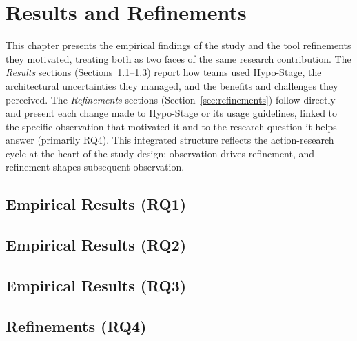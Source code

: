 
\chapter{Results and Refinements}
\label{chap:results}
\label{ch:results}

This chapter presents the empirical findings of the study and the tool refinements
they motivated, treating both as two faces of the same research contribution. The
\emph{Results} sections (Sections~\ref{sec:results-rq1}--\ref{sec:results-rq3}) report
how teams used Hypo-Stage, the architectural uncertainties they managed, and the
benefits and challenges they perceived. The \emph{Refinements} sections
(Section~\ref{sec:refinements}) follow directly and present each change made to
Hypo-Stage or its usage guidelines, linked to the specific observation that motivated it
and to the research question it helps answer (primarily RQ4). This integrated structure reflects the
action-research cycle at the heart of the study design: observation drives refinement,
and refinement shapes subsequent observation.

\section{Empirical Results (RQ1)}
\label{sec:results-rq1}


\section{Empirical Results (RQ2)}
\label{sec:results-rq2}


\section{Empirical Results (RQ3)}
\label{sec:results-rq3}


\section{Refinements (RQ4)}
\label{sec:results-rq4}
\label{sec:refinements}


